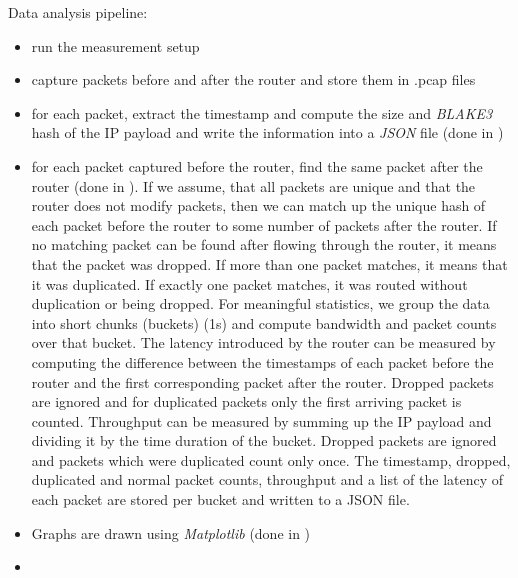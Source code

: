 
Data analysis pipeline:
\begin{itemize}
  \item run the measurement setup
  \item capture packets before and after the router and store them in .pcap files
  \item for each packet, extract the timestamp and compute the size and \textit{BLAKE3} \cite{wiki:BLAKE3} hash of the IP payload and write the information into a \textit{JSON} \cite{wiki:JSON} file (done in )
  \item for each packet captured before the router, find the same packet after the router (done in ). If we assume, that all packets are unique and that the router does not modify packets, then we can match up the unique hash of each packet before the router to some number of packets after the router. If no matching packet can be found after flowing through the router, it means that the packet was dropped. If more than one packet matches, it means that it was duplicated. If exactly one packet matches, it was routed without duplication or being dropped. For meaningful statistics, we group the data into short chunks (buckets) (1s) and compute bandwidth and packet counts over that bucket. The latency introduced by the router can be measured by computing the difference between the timestamps of each packet before the router and the first corresponding packet after the router. Dropped packets are ignored and for duplicated packets only the first arriving packet is counted. Throughput can be measured by summing up the IP payload  and dividing it by the time duration of the bucket. Dropped packets are ignored and packets which were duplicated count only once. The timestamp, dropped, duplicated and normal packet counts, throughput and a list of the latency of each packet are stored per bucket and written to a JSON file.
  \item Graphs are drawn using \textit{Matplotlib} \cite{Matplotlib} (done in )
  \item {}
\end{itemize}

